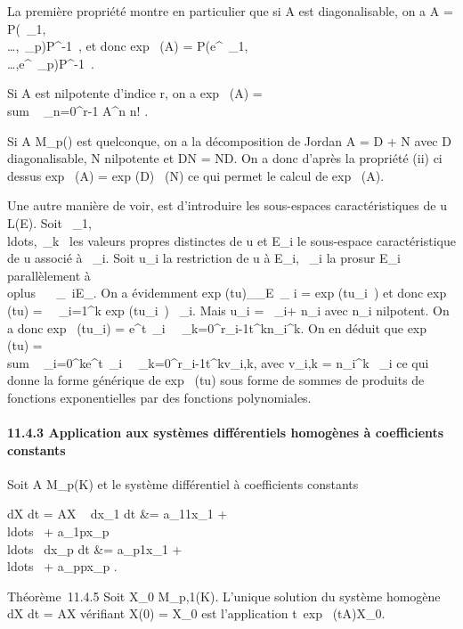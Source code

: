 \documentclass[]{article}
\begin{document}
La première propriété montre en particulier que si A est diagonalisable,
on a A =
P\mathrmdiag(\lambda~\_1,\\\ldots,\lambda~\_p)P^-1~,
et donc exp~ (A) =
P\mathrmdiag(e^\lambda~\_1,\\\ldots,e^\lambda~\_p)P^-1~.

Si A est nilpotente d'indice r, on a exp~ (A)
= \\sum ~
\_n=0^r-1 A^n \over n! .

Si A \in M\_p() est quelconque, on a la décomposition de Jordan A
= D + N avec D diagonalisable, N nilpotente et DN = ND. On a donc
d'après la propriété (ii) ci dessus exp~ (A)
= exp (D)\exp~ (N) ce
qui permet le calcul de exp~ (A).

Une autre manière de voir, est d'introduire les sous-espaces
caractéristiques de u \in L(E). Soit
\lambda~\_1,\\ldots,\lambda~\_k~
les valeurs propres distinctes de u et E\_i le sous-espace
caractéristique de u associé à \lambda~\_i. Soit u\_i la
restriction de u à E\_i, \pi~\_i la pro\jmathection sur
E\_i parallèlement à
\\oplus~ ~
\_\jmath\neq~iE\_\jmath. On a évidemment
exp (tu)\_\textbar{}\_E~\_
i = exp (tu\_i~) et donc
exp~ (tu) =\
\sum ~
\_i=1^k exp (tu\_i~) \cdot
\pi~\_i. Mais u\_i =
\lambda~\_i\mathrmId + n\_i avec
n\_i nilpotent. On a donc exp~
(tu\_i) = e^t\lambda~\_i\
\sum~
\_k=0^r\_i-1t^kn\_i^k. On
en déduit que exp~ (tu)
= \\sum ~
\_i=0^ke^t\lambda~\_i\
\sum~
\_k=0^r\_i-1t^kv\_i,k, avec
v\_i,k = n\_i^k \cdot \pi~\_i ce qui donne la
forme générique de exp~ (tu) sous forme de
sommes de produits de fonctions exponentielles par des fonctions
polynomiales.

\paragraph{11.4.3 Application aux systèmes différentiels homogènes à
coefficients constants}

Soit A \in M\_p(K) et le système différentiel à coefficients
constants

 dX \over dt = AX \Leftrightarrow
\left \ \cases 
dx\_1 \over dt &= a\_11x\_1 +
\\ldots~ +
a\_1px\_p \cr
\\ldots~
\cr  dx\_p \over dt &=
a\_p1x\_1 +
\\ldots~ +
a\_ppx\_p  \right .

Théorème~11.4.5 Soit X\_0 \in M\_p,1(K). L'unique solution
du système homogène  dX \over dt = AX vérifiant X(0)
= X\_0 est l'application
t\mapsto~exp~
(tA)X\_0.
\end{document}
